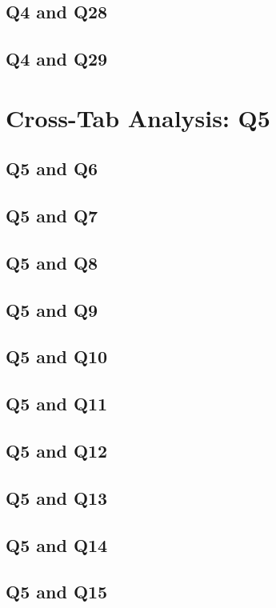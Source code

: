 \documentclass{report}
\begin{document}
\section{Q4 and Q28}\clearpage
\section{Q4 and Q29}\clearpage

\chapter{Cross-Tab Analysis: Q5}

\section{Q5 and Q6}\clearpage
\section{Q5 and Q7}\clearpage
\section{Q5 and Q8}\clearpage
\section{Q5 and Q9}\clearpage
\section{Q5 and Q10}\clearpage
\section{Q5 and Q11}\clearpage
\section{Q5 and Q12}\clearpage
\section{Q5 and Q13}\clearpage
\section{Q5 and Q14}\clearpage
\section{Q5 and Q15}\clearpage
\end{document}
